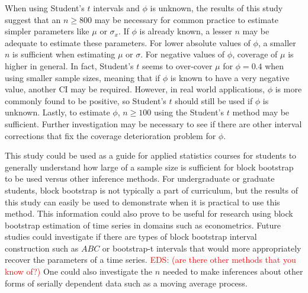 \documentclass[12pt, letterpaper, titlepage]{article}
\newcommand{\eds}[1]{\textcolor{red}{EDS: (#1)}}
\begin{document}
When using Student's $t$ intervals and $\phi$ is
unknown, the results of this study suggest that an $n \geq 800$ may be
necessary for common practice to estimate simpler parameters like $\mu$ 
or $\sigma_x$. If $\phi$ is already known, a lesser $n$ may be adequate
to
estimate these parameters. For lower absolute values of $\phi$, a smaller
$n$ is sufficient when estimating $\mu$ or $\sigma$. For negative
values of $\phi$, coverage of $\mu$ is higher in general. In fact, 
Student's $t$ seems to over-cover $\mu$ for $\phi = 0.4$ when using smaller
sample sizes, 
meaning that if $\phi$ is known to have a very negative value, another CI
may be required.
However, in real world applications, $\phi$ is
more commonly found to be positive, so Student's $t$ should still be used
if $\phi$ is unknown.
Lastly, to estimate $\phi$, $n \geq 100$ using the 
Student's $t$ method
 may be sufficient.
Further investigation may be necessary to see if there are other interval
corrections that fix the coverage deterioration problem for $\phi$.


This study could be used as a guide for applied statistics courses for students
to generally understand how large of a sample size is sufficient for block
bootstrap to be used versus other inference methods. For undergraduate or
graduate students, block bootstrap is not typically a part of curriculum, but the 
results of this study can easily be used to demonstrate when it is practical to use 
this method.
This information could also prove to be useful for research using block
bootstrap
estimation of time series in domains such as econometrics. Future studies
could investigate if there are types of block bootstrap interval
construction such as $ABC$ or bootstrap-t intervals
that would more appropriately recover the parameters of a time
series. \eds{are there other methods that you know of?} 
One could also investigate the $n$ needed to make inferences about
other forms of serially dependent data such as a moving average process. 




\end{document}
